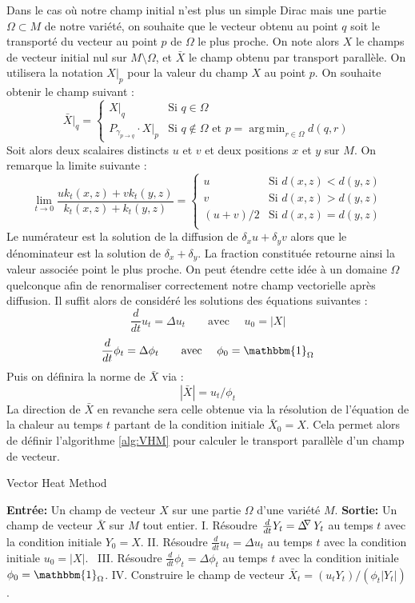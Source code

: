 \documentclass[11pt]{article}
\newcommand{\syst}[2]{\left\{ \begin{array}{#1} #2 \end{array} \right.}
\DeclareMathOperator{\connexionLaplacian}{\Delta^{\hspace{-3pt} \nabla}}
\DeclareMathOperator*{\argmin}{arg\,min}
\begin{document}
	Dans le cas où notre champ initial n'est plus un simple Dirac mais une partie $\Omega \subset M$ de notre variété, on souhaite que le vecteur obtenu au point $q$ soit le transporté du vecteur au point $p$ de $\Omega$ le plus proche. On note alors $X$ le champs de vecteur initial nul sur $M \setminus \Omega$, et $\bar{X}$ le champ obtenu par transport parallèle. On utilisera la notation $X|_p$ pour la valeur du champ $X$ au point $p$. On souhaite obtenir le champ suivant :
	$$ \bar{X}|_q = \syst{ll}{
		X|_q & \text{Si } q \in \Omega \\
		P_{\gamma_{p \rightarrow q}} \cdot X|_p & \text{Si } q \notin \Omega \text{ et } p = \argmin_{r \in \Omega} d(q, r)
	} $$
	Soit alors deux scalaires distincts $u$ et $v$ et deux positions $x$ et $y$ sur $M$. On remarque la limite suivante :
	$$ \lim_{t \rightarrow 0} \frac{u k_t(x, z) + v k_t(y, z)}{k_t(x, z) + k_t(y, z)} = \syst{ll}{
		u & \text{Si } d(x, z) < d(y, z) \\
		v & \text{Si } d(x, z) > d(y, z) \\
		(u+v) / 2 & \text{Si } d(x, z) = d(y, z) \\
	} $$
	Le numérateur est la solution de la diffusion de $\delta_x u + \delta_y v$ alors que le dénominateur est la solution de $\delta_x + \delta_y$. La fraction constituée retourne ainsi la valeur associée point le plus proche. On peut étendre cette idée à un domaine $\Omega$ quelconque afin de renormaliser correctement notre champ vectorielle après diffusion. Il suffit alors de considéré les solutions des équations suivantes :
	$$ \frac{d}{dt} u_t = \Delta u_t \qquad \text{avec } \quad u_0 = | X | $$
	$$ \frac{d}{dt} \phi_t = \Delta \phi_t \qquad \text{avec } \quad \phi_0 = \mathbbm{1}_\Omega $$
	Puis on définira la norme de $\bar{X}$ via :
	$$ | \bar{X} | = u_t / \phi_t $$
	La direction de $\bar{X}$ en revanche sera celle obtenue via la résolution de l'équation de la chaleur au temps $t$ partant de la condition initiale $\bar{X}_0 = X$. Cela permet alors de définir l'algorithme \ref{alg:VHM} pour calculer le transport parallèle d'un champ de vecteur.
	\begin{algorithm}[h]
		\caption{Vector Heat Method}
		\label{alg:VHM}
		\begin{algorithmic}
			\State \textbf{Entrée:} Un champ de vecteur $X$ sur une partie $\Omega$ d'une variété $M$.
			\State \textbf{Sortie:} Un champ de vecteur $\bar{X}$ sur $M$ tout entier.
			\State \hspace{10pt} I. \; Résoudre $\frac{d}{dt} Y_t = \connexionLaplacian Y_t$ au temps $t$ avec la condition initiale $Y_0 = X$.
			\State \hspace{6pt} II. \; Résoudre $\frac{d}{dt} u_t = \Delta u_t$ au temps $t$ avec la condition initiale $u_0 = |X|$.
			\State \, III. \; Résoudre $\frac{d}{dt} \phi_t = \Delta \phi_t$ au temps $t$ avec la condition initiale $\phi_0 = \mathbbm{1}_\Omega$.
			\State \hspace{3pt} IV. \; Construire le champ de vecteur $\bar{X}_t = ( u_t Y_t) / (\phi_t |Y_t|)$.
		\end{algorithmic}
	\end{algorithm}
	
\end{document}
